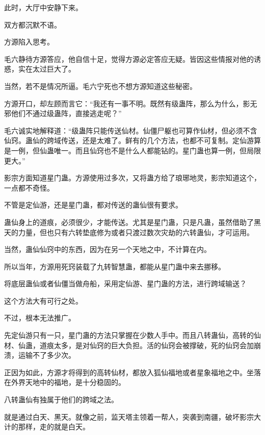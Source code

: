 \begin{this_body}
此时，大厅中安静下来。

双方都沉默不语。

方源陷入思考。

毛六静待方源答应，他自信十足，觉得方源必定答应无疑。皆因这些情报对他的诱惑，实在太过巨大了。

当然，若不是情况所逼。毛六宁死也不想方源知道这些秘密。

方源开口，却左顾而言它：“我还有一事不明。既然有级蛊阵，那么为什么，影无邪他们不通过级蛊阵，直接逃走呢？”

毛六诚实地解释道：“级蛊阵只能传送仙材。仙僵尸躯也可算作仙材，但必须不含仙窍。蛊仙的跨域传送，还是太难了。鲜有的几个方法，也都不可复制。定仙游算是一例，但仙蛊唯一。而且仙窍也不是什么人都能钻的。星门蛊也算一例，但局限更大。”

影宗方面知道星门蛊。方源使用过多次，又将蛊方给了琅琊地灵，影宗知道这个，一点都不奇怪。

不管是定仙游，还是星门蛊，都对传送的蛊仙很有要求。

蛊仙身上的道痕，必须很少，才能传送。尤其是星门蛊，只是凡蛊，虽然借助了黑天的力量，但也只有六转垫底修为或者只渡过数次灾劫的六转蛊仙，才可运用。

当然，蛊仙仙窍中的东西，因为在另一个天地之中，不计算在内。

所以当年，方源用死窍装载了九转智慧蛊，都能从星门蛊中来去挪移。

将底层蛊仙或者仙僵当做舟船，采用定仙游、星门蛊的方法，进行跨域输送？

这个方法大有可行之处。

不过，根本无法推广。

先定仙游只有一只，星门蛊的方法只掌握在少数人手中。而且八转蛊仙，高转的仙材、仙蛊，道痕太多，是对仙窍的巨大负担。活的仙窍会被撑破，死的仙窍会加崩溃，运输不了多少次。

正因为如此，方源才将得到的高转仙材，都放入狐仙福地或者星象福地之中。坐落在外界天地中的福地，是十分稳固的。

八转蛊仙有独属于他们的跨域之法。

就是通过白天、黑天。就像之前，监天塔主领着一帮人，突袭到南疆，破坏影宗大计的那样，走的就是白天。

\end{this_body}

